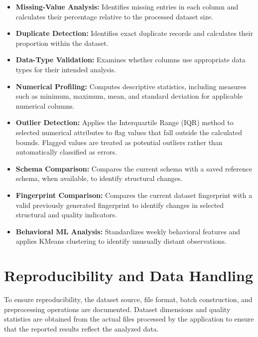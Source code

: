 \documentclass[12pt,a4paper]{report}
\begin{document}
\begin{itemize}
    \item \textbf{Missing-Value Analysis:} Identifies missing entries in each column and calculates their percentage relative to the processed dataset size.
    
    \item \textbf{Duplicate Detection:} Identifies exact duplicate records and calculates their proportion within the dataset.
    
    \item \textbf{Data-Type Validation:} Examines whether columns use appropriate data types for their intended analysis.
    
    \item \textbf{Numerical Profiling:} Computes descriptive statistics, including measures such as minimum, maximum, mean, and standard deviation for applicable numerical columns.
    
    \item \textbf{Outlier Detection:} Applies the Interquartile Range (IQR) method to selected numerical attributes to flag values that fall outside the calculated bounds. Flagged values are treated as potential outliers rather than automatically classified as errors.
    
    \item \textbf{Schema Comparison:} Compares the current schema with a saved reference schema, when available, to identify structural changes.
    
    \item \textbf{Fingerprint Comparison:} Compares the current dataset fingerprint with a valid previously generated fingerprint to identify changes in selected structural and quality indicators.
    \item \textbf{Behavioral ML Analysis:} Standardizes weekly behavioral features and applies KMeans clustering to identify unusually distant observations.
\end{itemize}




\section{Reproducibility and Data Handling}

To ensure reproducibility, the dataset source, file format, batch construction, and preprocessing operations are documented. Dataset dimensions and quality statistics are obtained from the actual files processed by the application to ensure that the reported results reflect the analyzed data.
\end{document}
